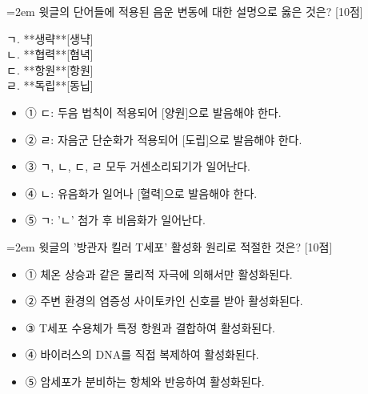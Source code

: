 \documentclass[10pt,a4paper]{article}
\newcommand{\qnum}[1]{%
  \tikz[baseline=(num.base)]{%
    \node[circle, fill=numCircle, text=white, inner sep=0pt,
          minimum size=18pt, font=\small\bfseries] (num) {#1};%
  }%
}
\newcommand{\pts}[1]{%
  \hfill\textcolor{ptsBadge}{[#1점]}%
}
\begin{document}
\vspace{4mm}
\begin{minipage}{\columnwidth}
{\hangindent=2em
\qnum{45}\enspace 윗글의 단어들에 적용된 음운 변동에 대한 설명으로 옳은 것은? \pts{10}
\par}

\vspace{3mm}
\begin{tcolorbox}[bogi]
ㄱ. **생략**[생냑] \\{}
ㄴ. **협력**[혐녁] \\{}
ㄷ. **항원**[항원] \\{}
ㄹ. **독립**[동닙]
\end{tcolorbox}
\vspace{3mm}
\begin{itemize}[leftmargin=2.5em, labelsep=0.3em, label={}, itemsep=4pt, parsep=1pt, topsep=0pt]
  \item ① ㄷ: 두음 법칙이 적용되어 [양원]으로 발음해야 한다.
  \item ② ㄹ: 자음군 단순화가 적용되어 [도립]으로 발음해야 한다.
  \item ③ ㄱ, ㄴ, ㄷ, ㄹ 모두 거센소리되기가 일어난다.
  \item ④ ㄴ: 유음화가 일어나 [혈력]으로 발음해야 한다.
  \item ⑤ ㄱ: 'ㄴ' 첨가 후 비음화가 일어난다.
\end{itemize}
\end{minipage}
\vspace{4mm}

\vspace{4mm}
\begin{minipage}{\columnwidth}
{\hangindent=2em
\qnum{46}\enspace 윗글의 '방관자 킬러 T세포' 활성화 원리로 적절한 것은? \pts{10}
\par}

\vspace{3mm}
\begin{itemize}[leftmargin=2.5em, labelsep=0.3em, label={}, itemsep=4pt, parsep=1pt, topsep=0pt]
  \item ① 체온 상승과 같은 물리적 자극에 의해서만 활성화된다.
  \item ② 주변 환경의 염증성 사이토카인 신호를 받아 활성화된다.
  \item ③ T세포 수용체가 특정 항원과 결합하여 활성화된다.
  \item ④ 바이러스의 DNA를 직접 복제하여 활성화된다.
  \item ⑤ 암세포가 분비하는 항체와 반응하여 활성화된다.
\end{itemize}
\end{minipage}
\vspace{4mm}
\end{document}
